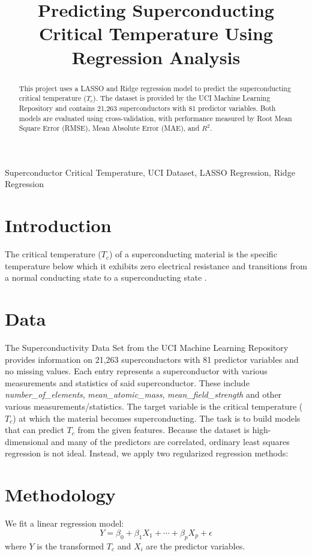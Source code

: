 \documentclass[conference]{IEEEtran}
\title{Predicting Superconducting Critical Temperature Using Regression Analysis}
\author{
  \IEEEauthorblockN{Miguel Ramirez}
  \IEEEauthorblockA{
    Department of Statistics and Data Science \\
    University of Central Florida \\
    Orlando, United States \\
    miramirez@knights.ucf.edu}
}
\begin{document}
\maketitle

\begin{abstract}
This project uses a LASSO and Ridge regression model to predict the superconducting critical temperature ($T_c$). 
The dataset is provided by the UCI Machine Learning Repository and contains 21,263 superconductors with 81 predictor variables. 
Both models are evaluated using cross-validation, with performance measured by Root Mean Square Error (RMSE), Mean Absolute Error (MAE), and $R^2$.
\end{abstract}
\begin{IEEEkeywords}
Superconductor Critical Temperature, UCI Dataset, LASSO Regression, Ridge Regression
\end{IEEEkeywords}

\section*{Introduction}

The critical temperature ($T_c$) of a superconducting material is the specific temperature below which it exhibits zero electrical resistance and transitions from a normal conducting state to a superconducting state \cite{sciencedirect_tc}.

\section{Data}
The Superconductivity Data Set from the UCI Machine Learning Repository provides information on 21,263 superconductors with 81 predictor variables and no missing values. 
Each entry represents a superconductor with various measurements and statistics of said superconductor. These include \emph{number\_of\_elements}, \emph{mean\_atomic\_mass}, \emph{mean\_field\_strength} and other various measurements/statistics. 
The target variable is the critical temperature ($T_c$) at which the material becomes superconducting. 
The task is to build models that can predict $T_c$ from the given features. 
Because the dataset is high-dimensional and many of the predictors are correlated, ordinary least squares regression is not ideal. Instead, we apply two regularized regression methods:

\section{Methodology}
We fit a linear regression model:
\begin{equation}
Y = \beta_0 + \beta_1X_1 + \cdots + \beta_pX_p + \epsilon
\end{equation}
where $Y$ is the transformed $T_c$ and $X_i$ are the predictor variables.
\end{document}
